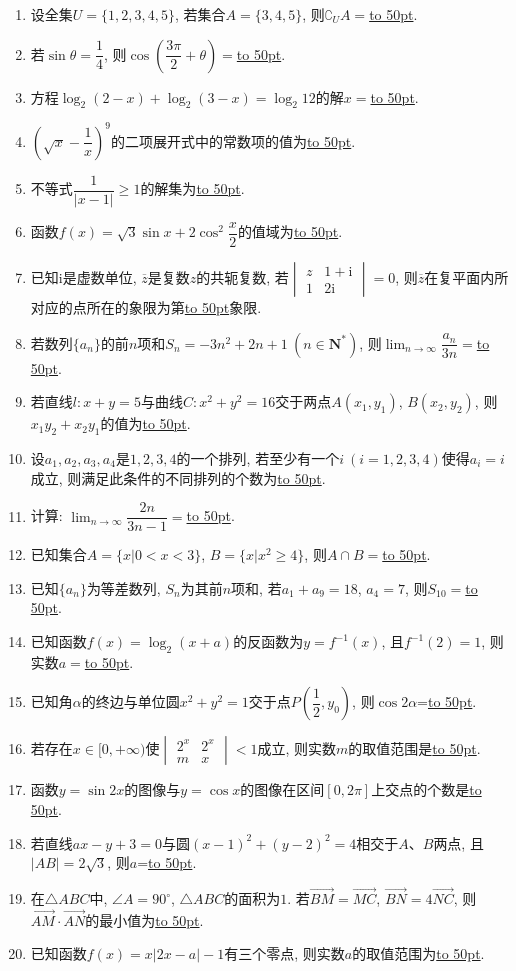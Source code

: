 \documentclass[10pt,a4paper]{article}
\newcommand{\blank}[1]{\underline{\hbox to #1pt{}}}
\begin{document}
\begin{enumerate}[1.]

\item 设全集$U=\{ 1,2,3,4,5\}$, 若集合$A=\{3,4,5\}$, 则$\complement_U A=$\blank{50}.
\item 若$\sin\theta=\dfrac14$, 则$\cos(\dfrac{3 \pi}2+\theta)=$\blank{50}.
\item 方程$\log_2(2-x)+\log_2(3-x)=\log_2 12$的解$x=$\blank{50}.
\item $(\sqrt x-\dfrac1x)^9$的二项展开式中的常数项的值为\blank{50}.
\item 不等式$\dfrac1{|x-1|}\ge 1 $的解集为\blank{50}.
\item 函数$f(x)=\sqrt 3\sin x+2\cos^2\dfrac x2$的值域为\blank{50}.
\item 已知$\mathrm{i}$是虚数单位, $\overline z$是复数$z$的共轭复数, 若$\begin{vmatrix} z & 1+\mathrm{i}  \\ 1 & 2\mathrm{i} \end{vmatrix}=0$, 则$\overline z$在复平面内所对应的点所在的象限为第\blank{50}象限.
\item 若数列$\{a_n\}$的前$n$项和$S_n=-3n^2+2n+1 \ (n\in \mathbf{N}^*)$, 则$\displaystyle\lim_{n\to\infty}\dfrac{a_n}{3n}=$\blank{50}.
\item 若直线$l:x+y=5$与曲线$C:x^2+y^2=16$交于两点$A(x_1,y_1)$, $B(x_2,y_2)$, 则$x_1y_2+x_2y_1$的值为\blank{50}.
\item 设$a_1,a_2,a_3,a_4$是$1,2,3,4$的一个排列, 若至少有一个$i\ (i=1,2,3,4)$使得$a_i=i$成立, 则满足此条件的不同排列的个数为\blank{50}.


\item 计算: $\displaystyle\lim_{n\to\infty}\dfrac{2n}{3n-1}=$\blank{50}.
\item 已知集合$A=\{x|0<x<3\}$, $B=\{x|x^2\ge 4\}$, 则$A\cap B=$\blank{50}.
\item 已知$\{a_n\}$为等差数列, $S_n$为其前$n$项和, 若$a_1+a_9=18$, $a_4=7 $, 则$S_{10}=$\blank{50}.
\item 已知函数$f(x)=\log_2(x+a)$的反函数为$y=f^{-1}(x)$, 且$f^{-1}(2)=1$, 则实数$a=$\blank{50}.
\item 已知角$\alpha$的终边与单位圆$x^2+y^2=1$交于点$P(\dfrac12,y_0)$, 则$\cos 2 \alpha$=\blank{50}.
\item 若存在$x\in [0,+\infty)$使$\begin{vmatrix}2^x & 2^x \\ m & x \end{vmatrix}<1$成立, 则实数$m$的取值范围是\blank{50}.
\item 函数$y=\sin 2x$的图像与$y=\cos x$的图像在区间$[0,2\pi]$上交点的个数是\blank{50}.
\item 若直线$ax-y+3=0$与圆$(x-1)^2+(y-2)^2=4$相交于$A$、$B$两点, 且$|AB|=2 \sqrt3$, 则$a$=\blank{50}.
\item 在$\triangle ABC$中, $\angle A=90^\circ $, $\triangle ABC$的面积为$1$. 若$\overrightarrow{BM}=\overrightarrow{MC}$, $\overrightarrow{BN}=4 \overrightarrow{NC}$, 则$\overrightarrow{AM}\cdot \overrightarrow{AN}$的最小值为\blank{50}.
\item 已知函数$f(x)=x|2x-a|-1$有三个零点, 则实数$a$的取值范围为\blank{50}.


\end{enumerate}
\end{document}
